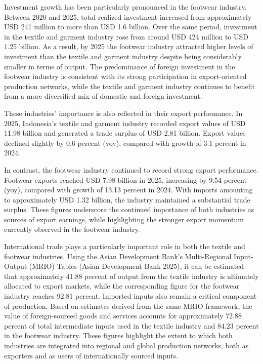 \documentclass[
  manuscript=article,
  layout=publish,
  year=2026,
  volume=1,
]{den}
\begin{document}
Investment growth has been particularly pronounced in the footwear
industry. Between 2020 and 2025, total realized investment increased
from approximately USD 241 million to more than USD 1.6 billion. Over
the same period, investment in the textile and garment industry rose
from around USD 424 million to USD 1.25 billion. As a result, by 2025
the footwear industry attracted higher levels of investment than the
textile and garment industry despite being considerably smaller in terms
of output. The predominance of foreign investment in the footwear
industry is consistent with its strong participation in export-oriented
production networks, while the textile and garment industry continues to
benefit from a more diversified mix of domestic and foreign investment.

These industries' importance is also reflected in their export
performance. In 2025, Indonesia's textile and garment industry recorded
export values of USD 11.98 billion and generated a trade surplus of USD
2.81 billion. Export values declined slightly by 0.6 percent (yoy),
compared with growth of 3.1 percent in 2024.

In contrast, the footwear industry continued to record strong export
performance. Footwear exports reached USD 7.98 billion in 2025,
increasing by 9.54 percent (yoy), compared with growth of 13.13 percent
in 2024. With imports amounting to approximately USD 1.32 billion, the
industry maintained a substantial trade surplus. These figures
underscore the continued importance of both industries as sources of
export earnings, while highlighting the stronger export momentum
currently observed in the footwear industry.

International trade plays a particularly important role in both the
textile and footwear industries. Using the Asian Development Bank's
Multi-Regional Input-Output (MRIO) Tables (Asian Development Bank 2025),
it can be estimated that approximately 41.88 percent of output from the
textile industry is ultimately allocated to export markets, while the
corresponding figure for the footwear industry reaches 92.81 percent.
Imported inputs also remain a critical component of production. Based on
estimates derived from the same MRIO framework, the value of
foreign-sourced goods and services accounts for approximately 72.88
percent of total intermediate inputs used in the textile industry and
84.23 percent in the footwear industry. These figures highlight the
extent to which both industries are integrated into regional and global
production networks, both as exporters and as users of internationally
sourced inputs.
\end{document}
